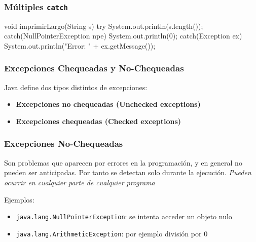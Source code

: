\documentclass{beamer}
\newcommand{\code}[1]{\texttt{#1}}
\newcommand{\codet}[1]{\texttt{#1}}
\begin{document}
\begin{frame}[fragile]
  \frametitle{Múltiples \code{catch}}

\begin{jsmall}
void imprimirLargo(String s) {
    try {      
      System.out.println(s.length());
    } catch(NullPointerException npe) {
      System.out.println(0);
    } catch(Exception ex) {
      System.out.println("Error: " + ex.getMessage());
    }
}
\end{jsmall}

  
\end{frame}

\begin{frame}
  \frametitle{Excepciones Chequeadas y No-Chequeadas}
  Java define dos tipos distintos de excepciones:

  \begin{itemize}
    
  \item \textbf{Excepciones no chequeadas (Unchecked exceptions)}

  \item \textbf{Excepciones chequeadas (Checked exceptions)}
  \end{itemize}
\end{frame}

\begin{frame}
  \frametitle{Excepciones No-Chequeadas}
    
  \begin{block}{}
    Son problemas que aparecen por errores en la programación, y en
    general no pueden ser anticipadas. Por tanto se detectan solo
    durante la ejecución. \emph{Pueden ocurrir en cualquier parte de
      cualquier programa}
  \end{block}

  \begin{block}{}
    Ejemplos:

    \begin{itemize}
    \item \codet{java.lang.NullPointerException}: se intenta acceder
      un objeto nulo
    \item \codet{java.lang.ArithmeticException}: por ejemplo división
      por 0
    \end{itemize}
  \end{block}

\end{frame}
\end{document}
